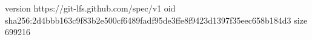 version https://git-lfs.github.com/spec/v1
oid sha256:2d4bbb163c9f83b2e500cf6489fadf95de3ffe8f9423d1397f35eec658b184d3
size 699216
